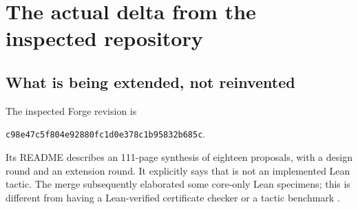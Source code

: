 \documentclass[11pt,letterpaper]{article}
\theoremstyle{definition}\newtheorem{definition}[theorem]{Definition}
\theoremstyle{remark}\newtheorem{remark}[theorem]{Remark}
\newcommand{\code}[1]{\texttt{#1}}
\begin{document}
\begin{abstract}
Forge already combines structural proof planning with exact algebraic certificates, observable-space and invariant-ideal closures, finite covers, and semantic countermodels. Repackaging those mechanisms would not advance the project. This article develops a separate quantitative branch: maximum reachability in rational Markov decision processes, expected hitting-time bounds valid for every scheduler, exact finite couplings and transport duals, certified probabilistic-bisimulation refinement, quantitative coupling bounds valid at every time horizon, and symbolic potential synthesis for infinite-state random walks.

The central change is not a larger collection of arithmetic lemmas. It is a family of proof rules converting finite, locally checkable inequalities and couplings into statements about unbounded probabilistic behavior. The treatment distinguishes a Bellman fixed point from its intended least solution, bisimulation failure from trace inequivalence, a failed contraction rate from nonmixing, and finite expected cost from termination. Search and checking are implemented separately using exact rational arithmetic. Every recorded case has an independent small-instance oracle or finite-distribution cross-check; their scope and limitations are explicit. The underlying mathematical theories are established prior art. The contribution is their concrete, compositional specialization into new Forge workers, including executable certificate formats and a falsifiable Lean integration plan.
\end{abstract}
\setcounter{tocdepth}{1}
\hypersetup{bookmarksdepth=2}
\begingroup\small\setlength{\parskip}{0pt}
\tableofcontents
\endgroup
\clearpage

\section{The actual delta from the inspected repository}
\subsection{What is being extended, not reinvented}
The inspected Forge revision is
\begin{center}\small\code{c98e47c5f804e92880fc1d0e378c1b95832b685c}.\end{center}
Its README describes an 111-page synthesis of eighteen proposals, with a design round and an extension round. It explicitly says that \forge{} is not an implemented Lean tactic. The merge subsequently elaborated some core-only Lean specimens; this is different from having a Lean-verified certificate checker or a tactic benchmark \cite{forge-readme,forge-conclusion}.
\end{document}
